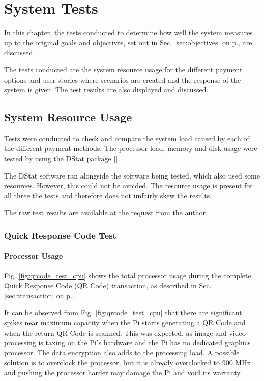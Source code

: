\chapter{System Tests}
\label{chap:6}

In this chapter, the tests  conducted to determine how well the system measures
up to the original goals and objectives, set out in Sec. \ref{sec:objectives} on
p.\pageref{sec:objectives}, are discussed.

The tests conducted are the system resource usage for the different payment
options and user stories where scenarios are created and the response of the
system is given. The test results are also displayed and discussed. 

\section{System Resource Usage}

Tests were conducted to check and compare the system load caused by each of the
different payment methods. The processor load, memory and disk usage were tested
by using the DStat package [\cite{website:dstat}].

The DStat software ran alongside the software being tested, which also used
some resources. However, this could not be avoided. The resource usage is
present for all three the tests and therefore does not unfairly skew the
results.

The raw test results are available at the request from the author.

\subsection{Quick Response Code Test}
\label{sec:qr-tests}

\subsubsection{Processor Usage}

Fig. \ref{fig:qrcode_test_cpu} shows the total processor usage during the complete
Quick Response Code (QR Code) transaction, as described in Sec.
\ref{sec:transaction} on p.\pageref{sec:transaction}.

It can be observed from Fig. \ref{fig:qrcode_test_cpu} that there are
significant spikes near maximum capacity when the Pi starts generating a QR
Code and when the return QR Code is scanned. This was expected, as image and
video processing is taxing on the Pi's hardware and the Pi has no dedicated
graphics processor. The data encryption also adds to the processing load. A possible
solution is to overclock the processor, but it is already overclocked to 900
MHz and pushing the processor harder may damage the Pi and void its warranty.

